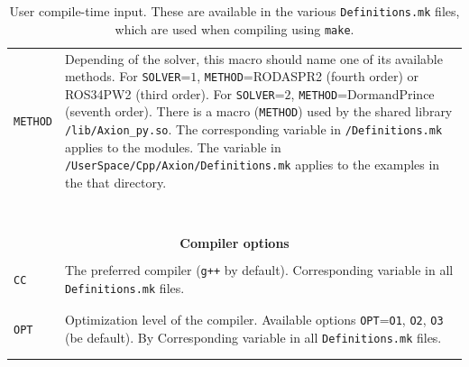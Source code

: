 \documentclass[11pt,a4paper]{article}
\begin{document}
\begin{table}[h!]
\begin{tabular}{l l}
		{\tt METHOD}& \multirow{1}{12cm}{Depending of the solver, this macro should name one of its available methods. For {\tt SOLVER}=$1$, {\tt METHOD}=RODASPR2 (fourth order) or ROS34PW2 (third order). For {\tt SOLVER}=$2$, {\tt METHOD}=DormandPrince (seventh order). There is a macro ({\tt METHOD}) used by the shared library {\tt \mimes/lib/Axion\_py.so}. The corresponding variable in {\tt \mimes/Definitions.mk} applies to the \PY modules. The variable in {\tt \mimes/UserSpace/Cpp/Axion/Definitions.mk} applies to the examples in the that directory.}\\\\\\\\\\\\\\\\
		 		
		\hline\\[-0.4cm]
		
		\multicolumn{2}{c}{\bf Compiler options}  \\
		\hline\\[-0.4cm]
		
		{\tt CC} &  \multirow{1}{12cm}{The preferred \CPP compiler ({\tt g++} by default). Corresponding variable in all {\tt Definitions.mk} files.} \\\\
		\hline\\[-0.4cm]
		
		{\tt OPT} &  \multirow{1}{12cm}{Optimization level of the compiler. Available options {\tt OPT}={\tt O1}, {\tt O2}, {\tt O3} (be default). By Corresponding variable in all {\tt Definitions.mk} files.}   \\\\
		\hline\\[-0.4cm]

	\end{tabular}
	\caption{User compile-time input. These are available in the various {\tt Definitions.mk} files, which are used when compiling using {\tt make}.}
	\label{tab:compile_time-options}
\end{table}



\pagebreak
{}
                        
\end{document}
